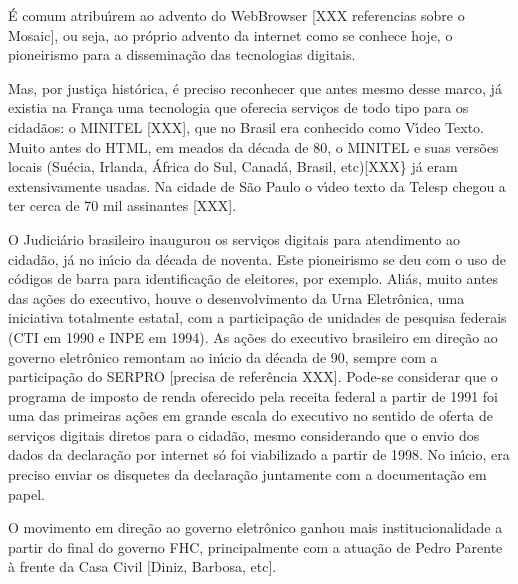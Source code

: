 \documentclass[
12pt,		%
openright,	%
twoside,  %
a4paper,			%
chapter=TITLE,		%
english,			%
french,				%
spanish,			%
brazil				%
]{USPSC-classe/USPSC_RedarTex}
\begin{document}
\'E comum atribu\'{\i}rem ao advento do WebBrowser [XXX referencias sobre o Mosaic], ou seja, ao pr\'oprio advento da internet como se conhece hoje, o pioneirismo para a dissemina\c{c}\~ao das tecnologias digitais.










Mas, por justi\c{c}a hist\'orica, \'e preciso reconhecer que antes mesmo desse marco, j\'a existia na Fran\c{c}a uma tecnologia que oferecia servi\c{c}os de todo tipo para os cidad\~aos: o MINITEL [XXX], que no Brasil era conhecido como V\'{\i}deo Texto. Muito antes do HTML, em meados da d\'ecada de 80, o MINITEL e suas vers\~oes locais (Su\'ecia, Irlanda, \'Africa do Sul, Canad\'a, Brasil, etc)[XXX\} j\'a eram extensivamente usadas. Na cidade de S\~ao Paulo o v\'{\i}deo texto da Telesp chegou a ter cerca de 70 mil assinantes [XXX].










O Judici\'ario brasileiro inaugurou os servi\c{c}os digitais para atendimento ao cidad\~ao, j\'a no in\'{\i}cio da d\'ecada de noventa. Este pioneirismo se deu com o uso de c\'odigos de barra para identifica\c{c}\~ao de eleitores, por exemplo. Ali\'as, muito antes das a\c{c}\~oes do executivo, houve o desenvolvimento da Urna Eletr\^onica, uma iniciativa totalmente estatal, com a participa\c{c}\~ao de unidades de pesquisa federais (CTI em 1990 e INPE em 1994). As a\c{c}\~oes do executivo brasileiro em dire\c{c}\~ao ao governo eletr\^onico remontam ao in\'{\i}cio da d\'ecada de 90, sempre com a participa\c{c}\~ao do SERPRO [precisa de refer\^encia XXX]. Pode-se considerar que o programa de imposto de renda oferecido pela receita federal a partir de 1991 foi uma das primeiras a\c{c}\~oes em grande escala do executivo no sentido de oferta de servi\c{c}os digitais diretos para o cidad\~ao, mesmo considerando que o envio dos dados da declara\c{c}\~ao por internet s\'o foi viabilizado a partir de 1998. No in\'{\i}cio, era preciso enviar os disquetes da declara\c{c}\~ao juntamente com a documenta\c{c}\~ao em papel.










O movimento em dire\c{c}\~ao ao governo eletr\^onico ganhou mais institucionalidade a partir do final do governo FHC, principalmente com a atua\c{c}\~ao de Pedro Parente \`a frente da Casa Civil [Diniz, Barbosa, etc].
\end{document}
